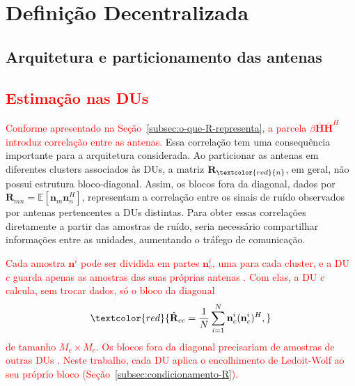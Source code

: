 \section{Definição Decentralizada}
\label{sec:dbp}



\subsection{Arquitetura e particionamento das antenas}

\subsection{\texorpdfstring{\textcolor{red}{Estimação nas DUs}}{Estimação nas DUs}}\label{subsec:estimacao-dus}

\textcolor{red}{Conforme apresentado na Seção~{\hypersetup{linkcolor=red}\ref{subsec:o-que-R-representa}}, a parcela $\beta\overline{\mathbf{H}}\overline{\mathbf{H}}^H$ introduz correlação entre as antenas.}
Essa correlação tem uma consequência importante para a arquitetura considerada. Ao particionar as antenas em diferentes clusters associados às DUs, a matriz $\mathbf{R}_{\textcolor{red}{n}}$, em geral, não possui estrutura bloco-diagonal. Assim, os blocos fora da diagonal, dados por $\mathbf{R}_{mn}=\mathbb{E}[\mathbf{n}_m\mathbf{n}_n^H]$, representam a correlação entre os sinais de ruído observados por antenas pertencentes a DUs distintas. Para obter essas correlações diretamente a partir das amostras de ruído, seria necessário compartilhar informações entre as unidades, aumentando o tráfego de comunicação.

\textcolor{red}{Cada amostra $\mathbf{n}^i$ pode ser dividida em partes $\mathbf{n}_c^i$, uma para cada cluster, e a DU $c$ guarda apenas as amostras das suas próprias antenas \cite{zhao2025jsac}. Com elas, a DU $c$ calcula, sem trocar dados, só o bloco da diagonal}
\begin{equation*}
\textcolor{red}{\hat{\mathbf{R}}_{cc}=\frac{1}{N}\sum_{i=1}^{N}\mathbf{n}_c^i(\mathbf{n}_c^i)^H,}
\end{equation*}
\textcolor{red}{de tamanho $M_c \times M_c$. Os blocos fora da diagonal precisariam de amostras de outras DUs \cite{zhao2025jsac}. Neste trabalho, cada DU aplica o encolhimento de Ledoit-Wolf ao seu próprio bloco (Seção~{\hypersetup{linkcolor=red}\ref{subsec:condicionamento-R}}).}

